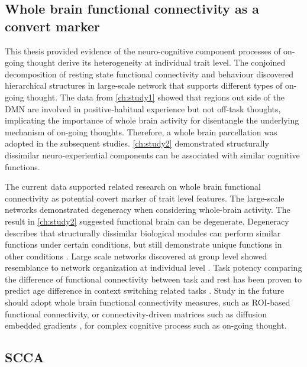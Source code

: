 \subsection{Whole brain functional connectivity as a convert marker}
This thesis provided evidence of the neuro-cognitive component processes of on-going thought derive its heterogeneity at individual trait level. The conjoined decomposition of resting state functional connectivity and behaviour discovered hierarchical structures in large-scale network  that supports different types of on-going thought. The data from \cref{ch:study1} showed that regions out side of the DMN are involved in positive-habitual experience but not off-task thoughts, implicating the importance of whole brain activity for disentangle the underlying mechanism of on-going thoughts. Therefore, a whole brain parcellation was adopted in the subsequent studies. \cref{ch:study2} demonstrated structurally dissimilar neuro-experiential components can be associated with similar cognitive functions. 

The current data supported related research on whole brain functional connectivity as potential covert marker of trait level features. The large-scale networks demonstrated degeneracy when considering whole-brain activity. The result in \cref{ch:study2} suggested functional brain can be degenerate. Degeneracy describes that structurally dissimilar biological modules can perform similar functions under certain conditions, but still demonstrate unique functions in other conditions \cite{Buckner2013}. Large scale networks discovered at group level showed resemblance to network organization at individual level \cite{Finn2015}. Task potency comparing the difference of functional connectivity between task and rest has been proven to predict age difference in context switching related tasks \cite{Chauvin2018}. Study in the future should adopt whole brain functional connectivity measures, such as ROI-based functional connectivity, or connectivity-driven matrices such as diffusion embedded gradients \cite{Margulies2016,Marquand2017}, for complex cognitive process such as on-going thought.

\subsection{SCCA}

